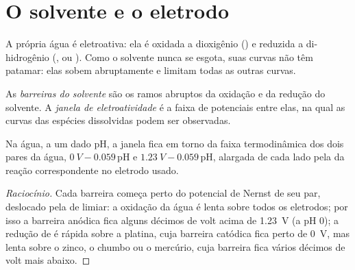 \section{O solvente e o eletrodo}

A própria água é eletroativa: ela é oxidada a dioxigênio
() e reduzida a di-hidrogênio (, ou
). Como o solvente nunca se esgota, suas curvas
não têm patamar: elas sobem abruptamente e limitam todas as outras curvas.

\begin{definition}\label{def:b2:current-potential-curves:window}
As \emph{barreiras do solvente} são os ramos abruptos da
oxidação e da redução do solvente. A \emph{janela de
eletroatividade} é a faixa de potenciais entre elas,
na qual as curvas das espécies dissolvidas podem ser observadas.
\end{definition}

\begin{proposition}\label{prop:b2:current-potential-curves:window}
Na água, a um dado pH, a janela fica em torno da faixa termodinâmica dos
dois pares da água, $\qty{0}{V} - 0.059\,\mathrm{pH}$ e $\qty{1.23}{V} -
0.059\,\mathrm{pH}$, alargada de cada lado pela  da reação
correspondente no eletrodo usado.
\end{proposition}

\begin{proof}[Raciocínio]
Cada barreira começa perto do potencial de Nernst de seu par, deslocado pela
 de limiar: a oxidação da água é lenta sobre todos os eletrodos;
por isso a barreira anódica fica alguns décimos de volt acima de \qty{1.23}{V}
(a pH 0); a redução de  é rápida sobre a platina, cuja barreira
catódica fica perto de \qty{0}{V}, mas lenta sobre o zinco, o chumbo ou o
mercúrio, cuja barreira fica vários décimos de volt mais abaixo.
\end{proof}

